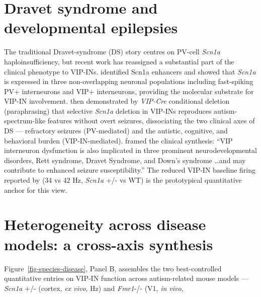 \documentclass[11pt]{article}
\begin{document}
\section{Dravet syndrome and developmental epilepsies}

The traditional Dravet-syndrome (DS) story centres on PV-cell \textit{Scn1a}
haploinsufficiency, but recent work has reassigned a substantial part of
the clinical phenotype to VIP-INs. \citet{Vormsteinschneider2020}
identified Scn1a enhancers and showed that \textit{Scn1a} is expressed in three
non-overlapping neuronal populations including fast-spiking PV+
interneurons and VIP+ interneurons, providing the molecular substrate for
VIP-IN involvement. \citet{Goff2023} then demonstrated by \textit{VIP-Cre}
conditional deletion (paraphrasing) that selective \textit{Scn1a} deletion in
VIP-INs reproduces autism-spectrum-like features without overt seizures, dissociating the two clinical axes of
DS --- refractory seizures (PV-mediated) and the autistic, cognitive, and
behavioral burden (VIP-IN-mediated). \citet{Gil2024} framed the
clinical synthesis: ``VIP interneuron dysfunction is also implicated in
three prominent neurodevelopmental disorders, Rett syndrome, Dravet
Syndrome, and Down's syndrome \dots and may contribute to enhanced seizure
susceptibility.'' The reduced VIP-IN baseline firing reported by
\citet{Goff2023} (34 vs 42 Hz, \textit{Scn1a} +/- vs WT) is the prototypical
quantitative anchor for this view.

\section{Heterogeneity across disease models: a cross-axis synthesis}

Figure~\ref{fig-species-disease}, Panel B, assembles the two best-controlled
quantitative entries on VIP-IN function across autism-related mouse
models --- \textit{Scn1a} +/- (cortex, \textit{ex vivo}, Hz) and \textit{Fmr1}-/- (V1, \textit{in vivo},

\end{document}
